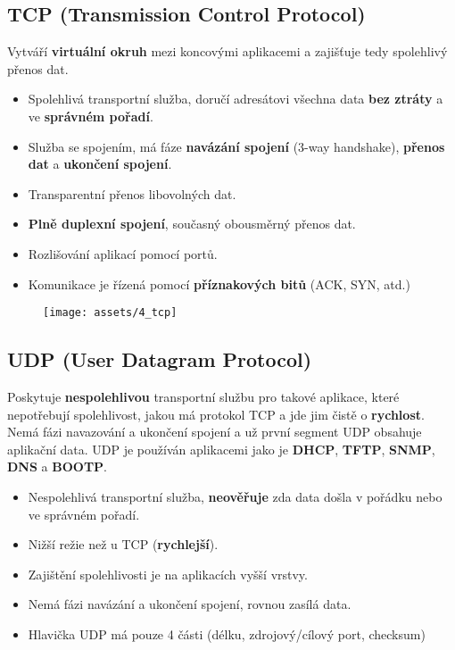 \subsection{TCP (Transmission Control Protocol)}
Vytváří \textbf{virtuální okruh} mezi koncovými aplikacemi a zajišťuje tedy spolehlivý přenos dat.
\begin{itemize}
    \item Spolehlivá transportní služba, doručí adresátovi všechna data \textbf{bez ztráty} a ve \textbf{správném pořadí}.
    \item Služba se spojením, má fáze \textbf{navázání spojení} (3-way handshake), \textbf{přenos dat} a \textbf{ukončení spojení}.
    \item Transparentní přenos libovolných dat.
    \item \textbf{Plně duplexní spojení}, současný obousměrný přenos dat.
    \item Rozlišování aplikací pomocí portů.
    \item Komunikace je řízená pomocí \textbf{příznakových bitů} (ACK, SYN, atd.)
\end{itemize}

\begin{figure}[H]
    \centering
    \texttt{[image: assets/4\_tcp]}
\end{figure}

\subsection{UDP (User Datagram Protocol)}
Poskytuje \textbf{nespolehlivou} transportní službu pro takové aplikace, které nepotřebují spolehlivost, jakou má protokol TCP a jde jim čistě o \textbf{rychlost}. Nemá fázi navazování a ukončení spojení a už první segment UDP obsahuje aplikační data. UDP je používán aplikacemi jako je \textbf{DHCP}, \textbf{TFTP}, \textbf{SNMP}, \textbf{DNS} a \textbf{BOOTP}.
\begin{itemize}
    \item Nespolehlivá transportní služba, \textbf{neověřuje} zda data došla v pořádku nebo ve správném pořadí.
    \item Nižší režie než u TCP (\textbf{rychlejší}).
    \item Zajištění spolehlivosti je na aplikacích vyšší vrstvy.
    \item Nemá fázi navázání a ukončení spojení, rovnou zasílá data.
    \item Hlavička UDP má pouze 4 části (délku, zdrojový/cílový port, checksum)
\end{itemize}

